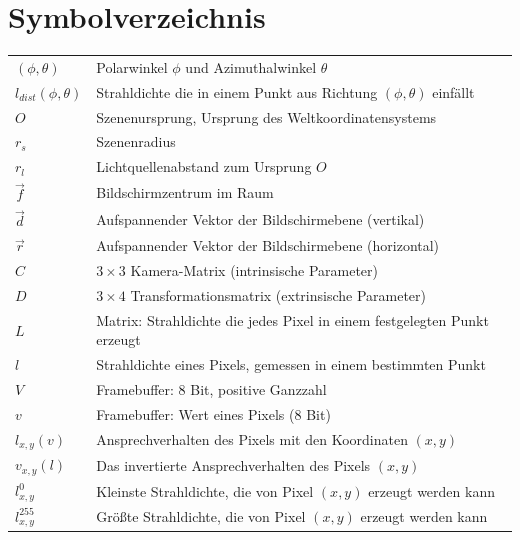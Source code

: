  \section{Symbolverzeichnis} \label{symbolverzeichnis}
 \begin{table}[H]
  \begin{tabular}{ll}
    $(\phi,\theta)$& Polarwinkel $\phi$ und Azimuthalwinkel $\theta$ \\
    $l_{dist}(\phi,\theta)$ & Strahldichte die in einem Punkt aus Richtung  $(\phi,\theta)$ einfällt\\

  $O$ & Szenenursprung, Ursprung des Weltkoordinatensystems \\
   $r_s$ & Szenenradius \\
   $r_l$ & Lichtquellenabstand zum Ursprung $O$ \\
   $\vec{f} $ & Bildschirmzentrum im Raum\\
   $\vec{d}$ & Aufspannender Vektor der Bildschirmebene (vertikal) \\
   $\vec{r}$ & Aufspannender Vektor der Bildschirmebene (horizontal) \\
   $C$ & $3\times3$ Kamera-Matrix (intrinsische Parameter)\\
   $D$ & $3\times4$ Transformationsmatrix (extrinsische Parameter)\\

 \hline
   $L$       & Matrix: Strahldichte die jedes Pixel in einem festgelegten Punkt erzeugt\\
   $l$      & Strahldichte eines Pixels, gemessen in einem bestimmten Punkt\\
   $V$       & Framebuffer: 8 Bit, positive Ganzzahl\\
   $v$     & Framebuffer: Wert eines Pixels (8 Bit)\\
   \hline
   $l_{x,y}(v)$  &  Ansprechverhalten des Pixels mit den Koordinaten  $(x,y)$ \\
   $v_{x,y}(l)$  &  Das invertierte Ansprechverhalten des Pixels $(x,y)$ \\
   $l^0_{x,y}$  &  Kleinste Strahldichte, die von Pixel $(x,y)$ erzeugt werden kann\\
   $l^{255}_{x,y}$  &  Größte Strahldichte, die von Pixel $(x,y)$ erzeugt werden kann\\
    

\end{tabular}
\end{table}
